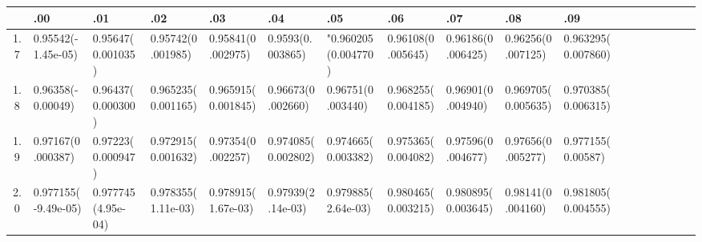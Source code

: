 \documentclass[
	article,			%
	12pt,				%
	twoside,			%
	a4paper,			%
	english,			%
	brazil,				%
	]{abntex2}
\begin{document}
\begin{landscape}
		\begin{table}\footnotesize
		\begin{tabular}{c||p{18mm}|p{18mm}|p{18mm}|p{18mm}|p{18mm}|p{18mm}|p{18mm}|p{18mm}|p{18mm}|p{18mm}|p{18mm}|p{18mm}|p{18mm}|p{18mm}|p{18mm}|p{18mm}|p{18mm}}
		    			~   & .00 & .01 & .02 & .03 & .04 & .05 & .06 & .07 & .08 & .09\\
    			\hline \hline
    			1.7 & 0.95542\newline(-1.45e-05)&0.95647\newline(0.001035)&0.95742\newline(0.001985)&0.95841\newline(0.002975)&0.9593\newline(0.003865)&"0.960205\newline(0.004770)&0.96108\newline(0.005645)&0.96186\newline(0.006425)&0.96256\newline(0.007125)&0.963295\newline(0.007860)\\
    			\hline
    			1.8 & 0.96358\newline(-0.00049)&0.96437\newline(0.000300)&0.965235\newline(0.001165)&0.965915\newline(0.001845)&0.96673\newline(0.002660)&0.96751\newline(0.003440)&0.968255\newline(0.004185)&0.96901\newline(0.004940)&0.969705\newline(0.005635)&0.970385\newline(0.006315)\\
    			\hline
    			1.9 &0.97167\newline(0.000387)&0.97223\newline(0.000947)&0.972915\newline(0.001632)&0.97354\newline(0.002257)&0.974085\newline(0.002802)&0.974665\newline(0.003382)&0.975365\newline(0.004082)&0.97596\newline(0.004677)&0.97656\newline(0.005277)&0.977155\newline(0.00587)\\\hline\hline
    			2.0 & 0.977155\newline(-9.49e-05)&0.977745\newline(4.95e-04)&0.978355\newline(1.11e-03)&0.978915\newline(1.67e-03)&0.97939\newline(2.14e-03)&0.979885\newline(2.64e-03)&0.980465\newline(0.003215)&0.980895\newline(0.003645)&0.98141\newline(0.004160)&0.981805\newline(0.004555)\\\hline

\end{tabular}
\end{table}
\end{landscape}
\end{document}
